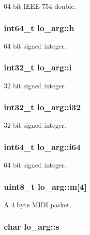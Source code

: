 64 bit I\+E\+E\+E-\/754 double. \hypertarget{unionlo__arg_a1773bb0e69aa3b137ddc26044334b2b4}{
\subsubsection[{h}]{\setlength{\rightskip}{0pt plus 5cm}int64\+\_\+t lo\+\_\+arg\+::h}}\label{unionlo__arg_a1773bb0e69aa3b137ddc26044334b2b4}
64 bit signed integer. \hypertarget{unionlo__arg_a7eefb9548603ff68b4fbd4c4d41c648b}{
\subsubsection[{i}]{\setlength{\rightskip}{0pt plus 5cm}int32\+\_\+t lo\+\_\+arg\+::i}}\label{unionlo__arg_a7eefb9548603ff68b4fbd4c4d41c648b}
32 bit signed integer. \hypertarget{unionlo__arg_a07e800463dc4ec5066b01033457ca018}{
\subsubsection[{i32}]{\setlength{\rightskip}{0pt plus 5cm}int32\+\_\+t lo\+\_\+arg\+::i32}}\label{unionlo__arg_a07e800463dc4ec5066b01033457ca018}
32 bit signed integer. \hypertarget{unionlo__arg_afe8046a8395e9af51cc759034ccfedd5}{
\subsubsection[{i64}]{\setlength{\rightskip}{0pt plus 5cm}int64\+\_\+t lo\+\_\+arg\+::i64}}\label{unionlo__arg_afe8046a8395e9af51cc759034ccfedd5}
64 bit signed integer. \hypertarget{unionlo__arg_a96d32df951c54eaff5dc67fc97a70c83}{
\subsubsection[{m}]{\setlength{\rightskip}{0pt plus 5cm}uint8\+\_\+t lo\+\_\+arg\+::m\mbox{[}4\mbox{]}}}\label{unionlo__arg_a96d32df951c54eaff5dc67fc97a70c83}
A 4 byte M\+I\+D\+I packet. \hypertarget{unionlo__arg_a15bbcf8284d75ad441b5cde7218548f6}{
\subsubsection[{s}]{\setlength{\rightskip}{0pt plus 5cm}char lo\+\_\+arg\+::s}}\label{unionlo__arg_a15bbcf8284d75ad441b5cde7218548f6}

